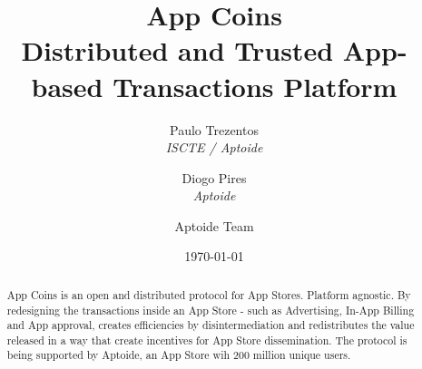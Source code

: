 \documentclass[12pt, a4paper, twoside, titlepage]{article}
\title{App Coins \\ Distributed and Trusted App-based Transactions Platform}
\author{Paulo Trezentos  \\
  {\em ISCTE / Aptoide}  \\
  \and 
  Diogo Pires \\
  {\em Aptoide} \\
  \and
  Aptoide Team
  }
\date{\today}
\begin{document}
\maketitle


\begin{abstract}
App Coins is an open and distributed protocol for App Stores. Platform agnostic. 
By redesigning the transactions inside an App Store - such as Advertising, In-App Billing and App approval, creates efficiencies by disintermediation and redistributes the value released in a way that create incentives for App Store dissemination.
The protocol is being supported by Aptoide, an App Store wih 200 million unique users. 
\end{abstract}


\tableofcontents











%




\end{document}

